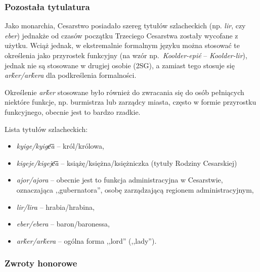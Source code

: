 \begin{spacing}{1.1}
\subsubsection{Pozostała tytulatura}

Jako monarchia, Cesarstwo posiadało szereg tytułów szlacheckich (np. \emph{lir},
czy \emph{eber}) jednakże od czasów początku Trzeciego Cesarstwa zostały
wycofane z użytku. Wciąż jednak, w ekstremalnie formalnym języku można stosować
te określenia jako przyrostek funkcyjny (na wzór np.~\emph{Koolder-epié} --
\emph{Koolder-lir}), jednak nie są stosowane w drugiej osobie (\textsc{2SG}), a
zamiast tego stosuje się \emph{arḱer/arḱera} dla podkreślenia formalności.



Określenie \emph{arḱer} stosowane było również do zwracania się do osób
pełniących niektóre funkcje, np. burmistrza lub zarządcy miasta, często w formie
przyrostku funkcyjnego, obecnie jest to bardzo rzadkie.

Lista tytułów szlacheckich:

\begin{itemize}
	\item \emph{kyige/kyige͞a} -- król/królowa,
	\item \emph{kigeje/kigeje͞a} -- książę/księżna/księżniczka (tytuły Rodziny
	Cesarskiej)
	\item \emph{ajor/ajora} -- obecnie jest to funkcja administracyjna w
	Cesarstwie, oznaczająca ,,gubernatora'', osobę zarządzającą regionem
	administracyjnym,
	\item \emph{lir/lira} -- hrabia/hrabina,
	\item \emph{eber/ebera} -- baron/baronessa,	
	\item \emph{arḱer/arḱera} -- ogólna forma ,,lord'' (,,lady'').
\end{itemize}

\subsubsection{Zwroty honorowe}


\end{spacing}
